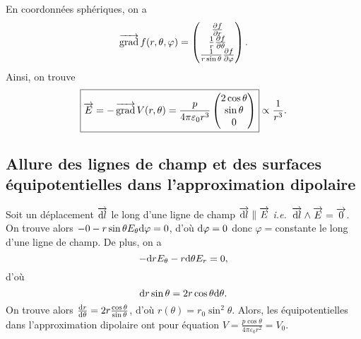 En coordonnées sphériques, on a 
\begin{equation*}
    \operatorname{\overrightarrow{\text{grad}}} f(r,\theta,\varphi)=\begin{pmatrix}
        \frac{\partial f}{\partial r}\\\frac{1}{r}\frac{\partial f}{\partial \theta}\\\frac{1}{r\sin\theta}\frac{\partial f}{\partial\varphi}
    \end{pmatrix}.
\end{equation*}
Ainsi, on trouve
\begin{equation*}
    \boxed{
        \protect\overrightarrow{{E}}=-\operatorname{\overrightarrow{\text{grad}}} V(r,\theta)=\frac{p}{4\pi\varepsilon_0 r^{3}}\begin{pmatrix}
            2\cos\theta\\\sin\theta\\0
        \end{pmatrix}
    }\propto\frac{1}{r^{3}}.
\end{equation*}

\subsection{Allure des lignes de champ et des surfaces équipotentielles dans l'approximation dipolaire}

Soit un déplacement $\protect\overrightarrow{{\mathrm{d} l}}$ le long d'une ligne de champ $\protect\overrightarrow{{\mathrm{d} l}}\parallel\protect\overrightarrow{{E}}$ \emph{i.e.~}$\protect\overrightarrow{{\mathrm{d} l}}\wedge\protect\overrightarrow{{E}}=\protect\overrightarrow{{0}}$. On trouve alors $-0-r\sin\theta E_{\theta}\mathrm{d}\varphi=0$, d'où $\mathrm{d}\varphi=0$ donc $\varphi=$constante le long d'une ligne de champ. De plus, on a 
\begin{equation*}
    -\mathrm{d} rE_{\theta}-r\mathrm{d}\theta E_r=0,
\end{equation*}
d'où
\begin{equation*}
    \mathrm{d} r\sin\theta=2r\cos\theta\mathrm{d}\theta.
\end{equation*}
On trouve alors $\frac{\mathrm{d} r}{\mathrm{d}\theta}=2r\frac{\cos\theta}{\sin\theta}$, d'où $r(\theta)=r_0\sin^{2}\theta$. Alors, les équipotentielles dans l'approximation dipolaire ont pour équation $V=\frac{p\cos\theta}{4\pi\varepsilon_0 r^{2}}=V_0$.